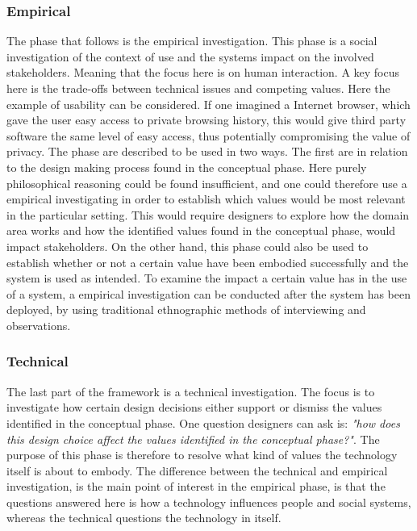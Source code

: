 \subsubsection{Empirical}
The phase that follows is the empirical investigation. This phase is a social investigation of the context of use and the systems impact on the involved stakeholders. Meaning that the focus here is on human interaction. A key focus here is the trade-offs between technical issues and competing values. Here the example of usability can be considered. If one imagined a Internet browser, which gave the user easy access to private browsing history, this would give third party software the same level of easy access, thus potentially compromising the value of privacy.\newline
The phase are described to be used in two ways. The first are in relation to the design making process found in the conceptual phase. Here purely philosophical reasoning could be found insufficient, and one could therefore use a empirical investigating in order to establish which values would be most relevant in the particular setting. This would require designers to explore how the domain area works and how the identified values found in the conceptual phase, would impact stakeholders. \newline
On the other hand, this phase could also be used to establish whether or not a certain value have been embodied successfully and the system is used as intended. To examine the impact a certain value has in the use of a system, a empirical investigation can be conducted after the system has been deployed, by using traditional ethnographic methods of interviewing and observations.

\subsubsection{Technical}
The last  part of the framework is a technical investigation. The focus is to investigate how certain design decisions either support or dismiss the values identified in the conceptual phase. One question designers can ask is: \textit{"how does this design choice affect the values identified in the conceptual phase?"}. The purpose of this phase is therefore to resolve what kind of values the technology itself is about to embody.
The difference between the technical and empirical investigation, is the main point of interest in the empirical phase, is that the questions answered here is how a technology influences people and social systems, whereas the technical questions the technology in itself. 

